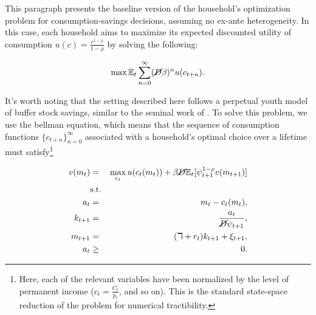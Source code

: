\par This paragraph presents the baseline version of the household's optimization problem for consumption-savings decisions, assuming no ex-ante heterogeneity. In this case, each household aims to maximize its expected discounted utility of consumption $u(c) = \frac{c^{1-\rho}}{1-\rho}$ by solving the following:

$$ \max \mathbb{E}_t \sum_{n=0}^{\infty}(\cancel{D}\beta)^{n} u(c_{t+n}). $$

\par It's worth noting that the setting described here follows a perpetual youth model of buffer stock savings, similar to the seminal work of \cite{ks1998}. To solve this problem, we use the bellman equation, which means that the sequence of consumption functions $\{c_{t+n}\}^{\infty}_{n=0}$ associated with a household's optimal choice over a lifetime must satisfy\footnote{Here, each of the relevant variables have been normalized by the level of permanent income ($c_t = \frac{C_t}{p_t}$, and so on). This is the standard state-space reduction of the problem for numerical tractibility.} 

\begin{eqnarray*}
  v(m_t) &=& \max_{c_t} u(c_t(m_t)) + \beta \cancel{D} \mathbb{E}_{t}[\psi_{t+1}^{1-\rho}v(m_{t+1})] \\
  &\text{s.t.}& \\
  a_t &=& m_t - c_t(m_t), \\
  k_{t+1} &=& \frac{a_t}{\cancel{D}\psi_{t+1}}, \\
  m_{t+1} &=& (\daleth + r_t)k_{t+1} + \xi_{t+1}, \\
  a_t &\geq& 0.
\end{eqnarray*}







